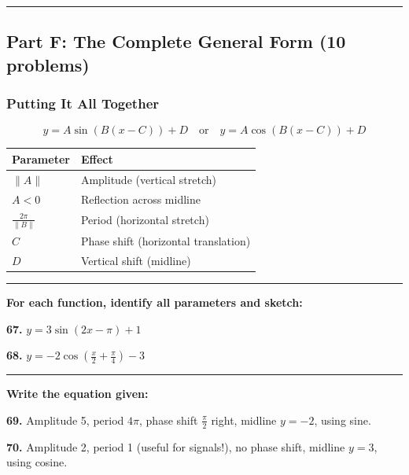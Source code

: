 \documentclass[
  11pt,
]{article}
\begin{document}
\begin{center}\rule{0.5\linewidth}{0.5pt}\end{center}

\hypertarget{part-f-the-complete-general-form-10-problems}{%
\subsection{Part F: The Complete General Form (10
problems)}\label{part-f-the-complete-general-form-10-problems}}

\hypertarget{putting-it-all-together}{%
\subsubsection{Putting It All Together}\label{putting-it-all-together}}

\[y = A\sin(B(x - C)) + D \quad \text{or} \quad y = A\cos(B(x - C)) + D\]

\begin{longtable}[]{@{}ll@{}}
\toprule\noalign{}
Parameter & Effect \\
\midrule\noalign{}
\endhead
\bottomrule\noalign{}
\endlastfoot
\(\|A\|\) & Amplitude (vertical stretch) \\
\(A < 0\) & Reflection across midline \\
\(\frac{2\pi}{\|B\|}\) & Period (horizontal stretch) \\
\(C\) & Phase shift (horizontal translation) \\
\(D\) & Vertical shift (midline) \\
\end{longtable}

\begin{center}\rule{0.5\linewidth}{0.5pt}\end{center}

\textbf{For each function, identify all parameters and sketch:}

\textbf{67.} \(y = 3\sin(2x - \pi) + 1\)

\textbf{68.} \(y = -2\cos\left(\frac{x}{2} + \frac{\pi}{4}\right) - 3\)

\begin{center}\rule{0.5\linewidth}{0.5pt}\end{center}

\textbf{Write the equation given:}

\textbf{69.} Amplitude 5, period \(4\pi\), phase shift \(\frac{\pi}{2}\)
right, midline \(y = -2\), using sine.

\textbf{70.} Amplitude 2, period 1 (useful for signals!), no phase
shift, midline \(y = 3\), using cosine.
\end{document}
